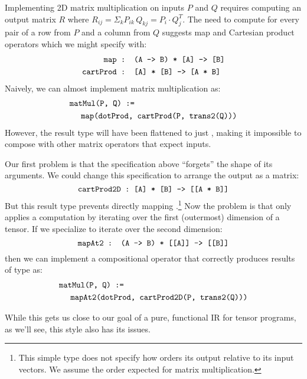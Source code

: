 \noindent
Implementing 2D matrix multiplication
  on inputs $P$ and $Q$ requires computing
  an output matrix $R$ where
  $R_{ij} = \Sigma_k P_{ik} \, Q_{kj}
          =  P_i \cdot Q^{T}_{j}$. %
The need to compute  for every pair
  of a row from $P$ and a column from $Q$
  suggests map and Cartesian product operators
  which we might specify with:
\begin{align*}
    \mathrm{\texttt{map}} &
    \mathrm{\texttt{ : (A -> B) * [A] -> [B]}} \\
    \mathrm{\texttt{cartProd}} &
    \mathrm{\texttt{ : [A] * [B] -> [A * B]}}
\end{align*}
Naively, we can almost implement matrix multiplication as:
{\color{red} \begin{align*}
  & \mathrm{\texttt{matMul(P, Q) :=}} \\
  & \;\;\;\;\; \mathrm{\texttt{map(dotProd, cartProd(P, trans2(Q)))}}
\end{align*} }
However, the result type will have been
  flattened to just {\color{red}\tcd{[f64]}},
  making it impossible to compose with other matrix
  operators that expect \tcd{[[f64]]} inputs.

Our first problem is that
  the  specification above
  ``forgets'' the shape of its arguments.
We could change this specification to
  arrange the output as a matrix:
$$
  \mathrm{\texttt{cartProd2D : [A] * [B] -> [[A * B]]}}
$$
But this result type prevents
  directly mapping .\footnote{
    This simple type does not specify how
     orders its output
    relative to its input vectors.
    We assume the order
    expected for matrix multiplication.}
Now the problem is that 
  only applies a computation by iterating
  over the first (outermost) dimension of a tensor.
If we specialize  to iterate
  over the second dimension:
$$
  \mathrm{\texttt{mapAt2 : (A -> B) * [[A]] -> [[B]]}}
$$
then we can implement a compositional
   operator that correctly produces
  results of type \tcd{[[f64]]} as:
\begin{align*}
  & \mathrm{\texttt{matMul(P, Q) :=}} \\
  & \;\;\;\;\; \mathrm{\texttt{mapAt2(dotProd, cartProd2D(P, trans2(Q)))}}
\end{align*}

While this gets us close
  to our goal of a pure, functional
  IR for tensor programs,
  as we'll see,
  this style also has its issues.

